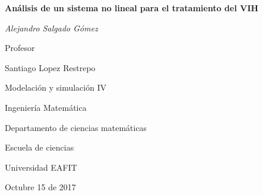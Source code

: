 \begin{titlepage}
    \centering
    \vspace{2cm}

    {\huge\bfseries Análisis de un sistema no lineal para el tratamiento del VIH\par}
    \vspace{5cm}
    {\Large\itshape Alejandro Salgado Gómez\par}
    \vfill

    Profesor\par
    {\large Santiago Lopez Restrepo\par}

    \vfill

    {\large Modelación y simulación IV \par}
    \vspace{0.2cm}
    {\large Ingeniería Matemática \par}
    \vspace{0.2cm}
    {\large Departamento de ciencias matemáticas \par}
    \vspace{0.2cm}
    {\large Escuela de ciencias \par}
    \vspace{0.2cm}
    {\large Universidad EAFIT \par}

    \vfill

    {\large Octubre 15 de 2017}
\end{titlepage}
